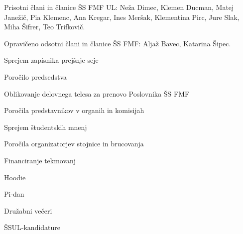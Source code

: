 \documentclass{seja}
\begin{document}
Prisotni člani in članice ŠS FMF UL:
Neža Dimec,
Klemen Ducman,
Matej Janežič,
Pia Klemenc,
Ana Kregar,
Ines Meršak,
Klementina Pirc,
Jure Slak,
Miha Šifrer,
Teo Trifkovič.

Opravičeno odsotni člani in članice ŠS FMF:
Aljaž Bavec, Katarina Šipec.


\begin{red*}
  \item Sprejem zapisnika prejšnje seje
  \item Poročilo predsedstva
  \item Oblikovanje delovnega telesa za prenovo Poslovnika ŠS FMF
  \item Poročila predstavnikov v organih in komisijah
  \item Sprejem študentskih mnenj
  \item Poročila organizatorjev stojnice in brucovanja
  \item Financiranje tekmovanj
  \item Hoodie
  \item Pi-dan
  \item Družabni večeri
  \item ŠSUL-kandidature
\end{red*}
\end{document}

